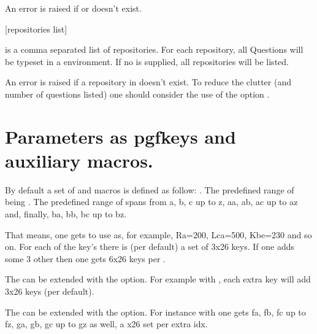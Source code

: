 \documentclass[10pt]{article}
\begin{document}
\begin{tsremark}
An error is raised if  or  doesn't exist.
\end{tsremark}

\begin{codedescribe}{\QuestionsList}
\begin{codesyntax}%
\tsmacro{\QuestionsList}[repositories list]{}
\end{codesyntax}
 is a comma separated list of repositories. For each repository,  all Questions will be typeset in a  environment. If no  is supplied, all repositories will be listed.
\end{codedescribe}

\begin{tsremark}
An error is raised if a repository in  doesn't exist. To reduce the clutter (and number of questions listed) one should consider the use of the option .
\end{tsremark}


\section{Parameters as pgfkeys and auxiliary macros.}\label{parameters}

By default a set of  and macros is defined as follow: . The predefined range of  being . The predefined range of  spans from a, b, c up to z, aa, ab, ac up to az and, finally, ba, bb, bc up to bz. 
\begin{tsremark}
That means, one gets to use  as, for example, Ra=200, Lca=500, Kbe=230 and so on. For each of the key's  there is (per default) a set of 3x26 keys. If one adds some 3 other  then one gets 6x26 keys per .
\end{tsremark}
\begin{tsremark}
The  can be extended with the  option. For example with , each extra key will add 3x26 keys (per default).
\end{tsremark}
\begin{tsremark}
The  can be extended with the  option. For instance with  one gets fa, fb, fc up to fz, ga, gb, gc up to gz as well, a x26 set per extra idx.
\end{tsremark}
\end{document}
